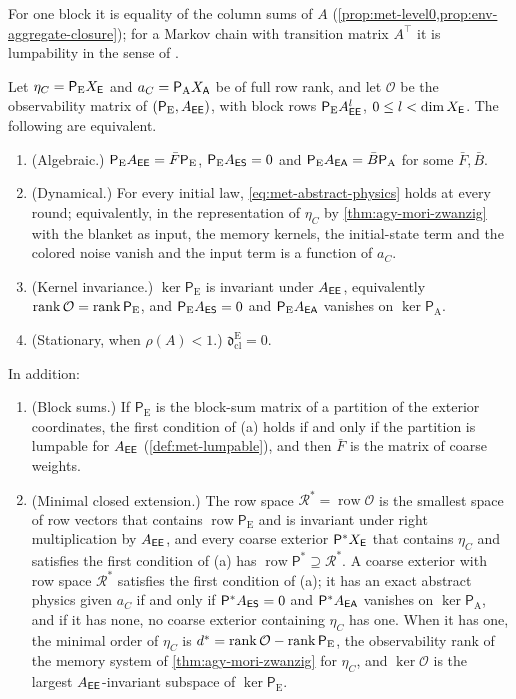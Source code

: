 For one block it is equality of the column sums of $A$ (\cref{prop:met-level0,prop:env-aggregate-closure}); for a Markov chain with transition matrix $A^\top$ it is lumpability in the sense of \citet{kemeny1960finite}.

\begin{theorem}\label{thm:met-abstract-physics}
Let $\eta_C=\mathsf P_{\mathrm E}X_{\mathsf{E}}$ and $a_C=\mathsf P_{\mathrm A}X_{\mathsf{A}}$ be of full row rank, and let $\mathcal O$ be the observability matrix of $(\mathsf P_{\mathrm E},A_{\mathsf{E}\mathsf{E}})$, with block rows $\mathsf P_{\mathrm E}A_{\mathsf{E}\mathsf{E}}^l$, $0\le l<\dim X_{\mathsf{E}}$. The following are equivalent.
\begin{enumerate}
\item[(a)] (Algebraic.) $\mathsf P_{\mathrm E}A_{\mathsf{E}\mathsf{E}}=\bar F\mathsf P_{\mathrm E}$, $\mathsf P_{\mathrm E}A_{\mathsf{E}\mathsf{S}}=0$ and $\mathsf P_{\mathrm E}A_{\mathsf{E}\mathsf{A}}=\bar B\mathsf P_{\mathrm A}$ for some $\bar F,\bar B$.
\item[(b)] (Dynamical.) For every initial law, \eqref{eq:met-abstract-physics} holds at every round; equivalently, in the representation of $\eta_C$ by \cref{thm:agy-mori-zwanzig} with the blanket as input, the memory kernels, the initial-state term and the colored noise vanish and the input term is a function of $a_C$.
\item[(c)] (Kernel invariance.) $\ker\mathsf P_{\mathrm E}$ is invariant under $A_{\mathsf{E}\mathsf{E}}$, equivalently $\operatorname{rank}\mathcal O=\operatorname{rank}\mathsf P_{\mathrm E}$, and $\mathsf P_{\mathrm E}A_{\mathsf{E}\mathsf{S}}=0$ and $\mathsf P_{\mathrm E}A_{\mathsf{E}\mathsf{A}}$ vanishes on $\ker\mathsf P_{\mathrm A}$.
\item[(d)] (Stationary, when $\rho(A)<1$.) $\mathfrak d^{\mathrm E}_{\mathrm{cl}}=0$.
\end{enumerate}
In addition:
\begin{enumerate}
\item[(e)] (Block sums.) If $\mathsf P_{\mathrm E}$ is the block-sum matrix of a partition of the exterior coordinates, the first condition of (a) holds if and only if the partition is lumpable for $A_{\mathsf{E}\mathsf{E}}$ (\cref{def:met-lumpable}), and then $\bar F$ is the matrix of coarse weights.
\item[(f)] (Minimal closed extension.) The row space $\mathcal R^\ast=\operatorname{row}\mathcal O$ is the smallest space of row vectors that contains $\operatorname{row}\mathsf P_{\mathrm E}$ and is invariant under right multiplication by $A_{\mathsf{E}\mathsf{E}}$, and every coarse exterior $\mathsf P^\ast X_{\mathsf{E}}$ that contains $\eta_C$ and satisfies the first condition of (a) has $\operatorname{row}\mathsf P^\ast\supseteq\mathcal R^\ast$. A coarse exterior with row space $\mathcal R^\ast$ satisfies the first condition of (a); it has an exact abstract physics given $a_C$ if and only if $\mathsf P^\ast A_{\mathsf{E}\mathsf{S}}=0$ and $\mathsf P^\ast A_{\mathsf{E}\mathsf{A}}$ vanishes on $\ker\mathsf P_{\mathrm A}$, and if it has none, no coarse exterior containing $\eta_C$ has one. When it has one, the minimal order of $\eta_C$ is $d^\ast=\operatorname{rank}\mathcal O-\operatorname{rank}\mathsf P_{\mathrm E}$, the observability rank of the memory system of \cref{thm:agy-mori-zwanzig} for $\eta_C$, and $\ker\mathcal O$ is the largest $A_{\mathsf{E}\mathsf{E}}$-invariant subspace of $\ker\mathsf P_{\mathrm E}$.

\end{enumerate}
\end{theorem}
